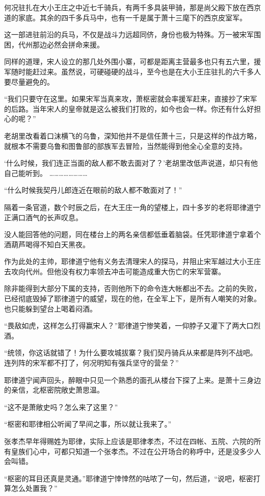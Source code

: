 何况驻扎在大小王庄之中近七千骑兵，有两千多具装甲骑，那是尚父殿下放在西京道的家底。其余的四千多兵马中，也有一千是属于萧十三麾下的西京皮室军。

这一部进驻前沿的兵马，不仅是战斗力远超同侪，身份也极为特殊。万一被宋军围困，代州那边必然会拼命来援。

同样的道理，宋人设立的那几处外围小寨，可都是距离主营最多也只有五六里，援军随时能赶过来。虽然说，可硬碰硬的战斗，至今也是在大小王庄驻扎的六千多人要尽量避免的。

“我们只要守在这里。如果宋军当真来攻，萧枢密就会率援军赶来，直接抄了宋军的后路。当年宋人的皇帝就是这么被我们打败的，如今也会一样。你还有什么好担心的呢？”

老胡里改看着口沫横飞的乌鲁，深知他并不是信任萧十三，只是这样的作战方略，就根本不需要乌鲁和图鲁部的部族军去冒险，当然能得到他全心全意的支持。

‘什么时候，我们连正当面的敌人都不敢去面对了？’老胡里改低声说道，却只有他自己能听到。
……………………

“什么时候我契丹儿郎连近在眼前的敌人都不敢面对了！”

隔着一条官道，数个时辰之后，在大王庄一角的望楼上，四十多岁的老将耶律道宁正满口酒气的长声叹息。

没人能回答他的问题，同在楼台上的两名亲信都低垂着脑袋。任凭耶律道宁拿着个酒葫芦喝得不知白天黑夜。

作为此处的主帅，耶律道宁他有义务去清理宋人的探马，并阻止宋军越过大小王庄去攻向代州。但他没有权力率领去冲击可能造成重大伤亡的宋军营寨。

除非能得到大部分下属的支持，否则他所下的命令连大帐都出不去。之前的失败，已经彻底毁掉了耶律道宁的威望，现在的他，在全军上下，是所有人嘲笑的对象。也只能躲到望台上喝着闷酒。

“畏敌如虎，这样怎么打得赢宋人？”耶律道宁惨笑着，一仰脖子又灌下了两大口烈酒。

“统领，你这话就错了！为什么要攻城拔寨？我们契丹骑兵从来都是阵列不战吧。连列阵的宋军都不打了，何况明知有强兵坚守的营垒？”

耶律道宁闻声回头，醉眼中只见一个熟悉的面孔从楼台下探了上来。是萧十三身边的亲信，北枢密院敞史萧思温。

“这不是萧敞史吗？怎么来了这里？”

“枢密和耶律相公听闻了早间之事，所以就让我来了。”

张孝杰早年得赐姓为耶律，实际上应该是耶律孝杰，不过在四帐、五院、六院的所有皇族们心中，可都只知道一个张孝杰。不过在公开场合的称呼中，还是没多少人会叫错。

“枢密的耳目还真是灵通。”耶律道宁悻悻然的咕哝了一句，然后道，“说吧，枢密打算怎么处置我？”
